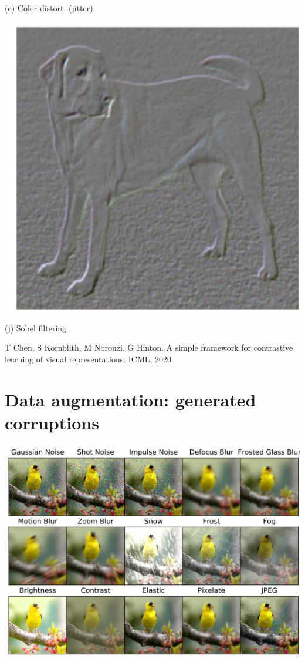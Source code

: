 \documentclass[10pt]{article}
\begin{document}
(e) Color distort. (jitter)

\begin{center}
\includegraphics[max width=\textwidth]{2024_01_08_959e2db67a31f073f6d2g-24(9)}
\end{center}

(j) Sobel filtering

T Chen, S Kornblith, M Norouzi, G Hinton. A simple framework for contrastive learning of visual representations. ICML, 2020

\section*{Data augmentation: generated corruptions}
\begin{center}
\includegraphics[max width=\textwidth]{2024_01_08_959e2db67a31f073f6d2g-25}
\end{center}
\end{document}
